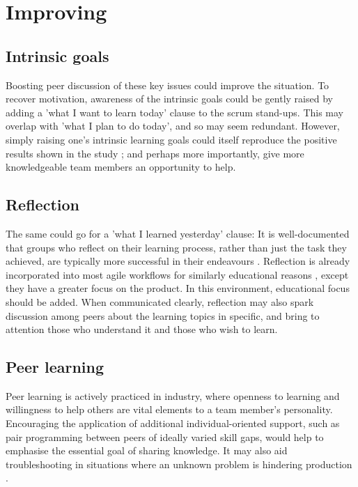 \documentclass{scrartcl}
\begin{document}
\section{Improving}
\subsection{Intrinsic goals}
Boosting peer discussion of these key issues could improve the situation. To recover motivation, awareness of the intrinsic goals could be gently raised by adding a 'what I want to learn today' clause to the scrum stand-ups. This may overlap with 'what I plan to do today', and so may seem redundant. However, simply raising one's intrinsic learning goals could itself reproduce the positive results shown in the study \cite{motivation}; and perhaps more importantly, give more knowledgeable team members an opportunity to help.

\subsection{Reflection}
The same could go for a 'what I learned yesterday' clause: It is well-documented that groups who reflect on their learning process, rather than just the task they achieved, are typically more successful in their endeavours \cite{effectivegroups, learnreflection}. Reflection is already incorporated into most agile workflows for similarly educational reasons \cite{agile, scrum}, except they have a greater focus on the product. In this environment, educational focus should be added. When communicated clearly, reflection may also spark discussion among peers about the learning topics in specific, and bring to attention those who understand it and those who wish to learn.

\subsection{Peer learning}
Peer learning is actively practiced in industry, where openness to learning \cite{devstudy} and willingness to help others \cite{collaboration} are vital elements to a team member's personality. Encouraging the application of additional individual-oriented support, such as pair programming between peers of ideally varied skill gaps, would help to emphasise the essential goal of sharing knowledge. It may also aid troubleshooting in situations where an unknown problem is hindering production \cite{collaboration, motivation}.
\end{document}
